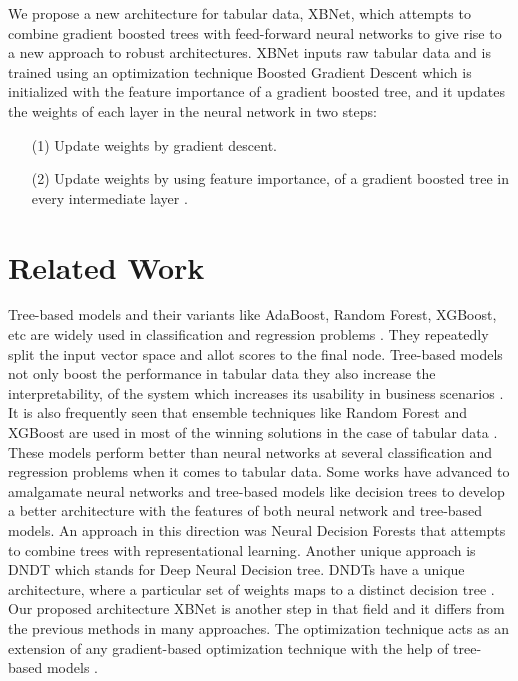 \documentclass[review]{elsarticle}
\begin{document}
We propose a new architecture for tabular
data, XBNet, which attempts to combine gradient boosted trees with feed-forward neural networks to give rise to a new approach to robust architectures. XBNet inputs raw tabular data and is trained using an optimization technique Boosted Gradient Descent which is initialized with the feature importance of a gradient boosted tree, and it updates the weights of each layer in the neural network in two steps:
\begin{enumerate}
\item[(1)] Update weights by gradient descent.
\item[(2)] Update weights by using feature importance, of a gradient boosted tree in every intermediate layer \cite{hooker2018evaluating}.
\end{enumerate}

\section{Related Work}

Tree-based models and their variants like AdaBoost, Random Forest, XGBoost, etc are widely used in classification and regression problems \cite{hastie2009multi}. They repeatedly split
the input vector space and allot scores to the final node.
Tree-based models not only boost the performance in tabular data they also increase the interpretability, of the system which increases its usability in business scenarios \cite{malioutov2017learning}. It is also frequently seen that  ensemble techniques like Random Forest and XGBoost are used in most of the winning solutions in the case of tabular data \cite{pedregosa2011scikit}
\cite{breiman2001random} \cite{10.1145/2939672.2939785}. These models perform better than neural networks at several classification and regression problems when it comes to tabular data. 
Some works have advanced to amalgamate neural networks and tree-based models like decision trees to develop a better architecture with the features of both neural network and tree-based models. An approach in this direction was Neural Decision Forests that attempts to combine trees with representational learning\cite{rota2014neural}. Another unique approach is DNDT which stands for Deep Neural Decision tree. DNDTs have a unique architecture, where a particular set of weights maps to a distinct decision tree \cite{yang2018deep}. Our proposed architecture XBNet is another step in that field and it differs from the previous methods in many approaches. The optimization technique acts as an extension of any gradient-based optimization technique with the help of tree-based models \cite{ruder2016overview}. 
\end{document}
